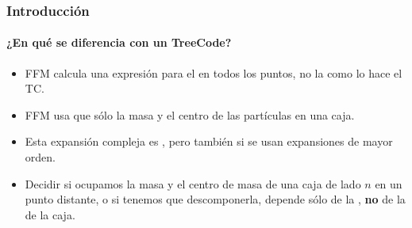 \begin{frame}
    \frametitle{Introducción}
    \framesubtitle{¿En qué se diferencia con un TreeCode?}

    \begin{itemize}
        \item<1-> FFM calcula una expresión para el  en todos los puntos, no la  como lo hace el TC.
        \item<2-> FFM usa  que sólo la masa y el centro de las partículas en una caja.
        \item<2-> Esta expansión compleja es , pero también  si se usan expansiones de mayor orden.
        \item<3-> Decidir si ocupamos la masa y el centro de masa de una caja de lado $n$ en un punto distante,
                  o si tenemos que descomponerla, depende sólo de la ,
                  \textbf{no} de la  de la caja.
    \end{itemize}
\end{frame}
